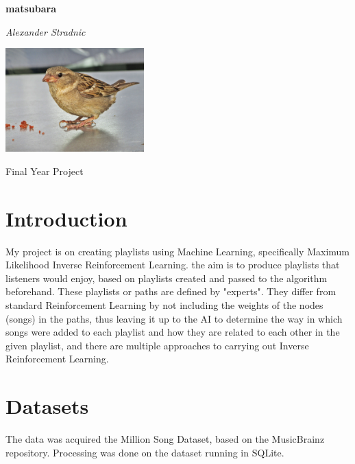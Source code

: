 \documentclass[a4paper, 12pt]{article}
\begin{document}
\begin{titlepage}
   \begin{center}
       \vspace*{1cm}

       \huge
       \textbf{matsubara}

       \vspace{1cm}

       \textit{Alexander Stradnic}

        \vspace{3cm}

       \includegraphics[width=0.4\textwidth]{"logo.jpg"}

       \vfill

       Final Year Project

       \vspace*{1cm}


   \end{center}
\end{titlepage}

\section{Introduction}
My project is on creating playlists using Machine Learning, specifically Maximum Likelihood Inverse Reinforcement Learning. the aim is to produce playlists that listeners would enjoy, based on playlists created and passed to the algorithm beforehand. These playlists or paths are defined by "experts". They differ from standard Reinforcement Learning by not including the weights of the nodes (songs) in the paths, thus leaving it up to the AI to determine the way in which songs were added to each playlist and how they are related to each other in the given playlist, and there are multiple approaches to carrying out Inverse Reinforcement Learning.

\section{Datasets}
The data was acquired the Million Song Dataset, based on the MusicBrainz repository. Processing was done on the dataset running in SQLite.
\end{document}
